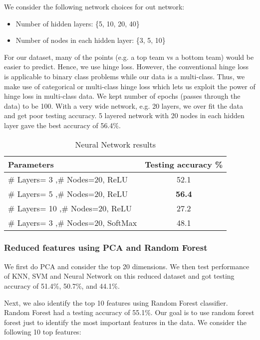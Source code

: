 \documentclass{article}
\begin{document}
We consider the following network choices for out network:
\begin{itemize}
	\item Number of hidden layers: \{5, 10, 20, 40\}
	\item Number of nodes in each hidden layer: \{3, 5, 10\} 
\end{itemize}
For our dataset, many of the points (e.g. a top team vs a bottom team) would be easier to predict. Hence, we use hinge loss. However, the conventional hinge loss is applicable to binary class problems while our data is a multi-class. Thus, we make use of categorical or multi-class hinge loss \cite{categorical_hinge} which lets us exploit the power of hinge loss in multi-class data. We kept number of epochs (passes through the data) to be 100. With a very wide network, e.g. 20 layers, we over fit the data and get poor testing accuracy. 5 layered network with 20 nodes in each hidden layer gave the best accuracy of 56.4\%.

\begin{table}
	\caption{Neural Network results}
	\label{tab:nn}
	\centering
	\begin{tabular}{l|c}
	\toprule
	\textbf{Parameters} & \textbf{Testing accuracy \%} \\
	\midrule
	\# Layers= 3 ,\# Nodes=20, ReLU  & 52.1\\
	\# Layers= 5 ,\# Nodes=20, ReLU  & \textbf{56.4} \\
	\# Layers= 10 ,\# Nodes=20, ReLU  & 27.2\\
	\# Layers= 3 ,\# Nodes=20, SoftMax  & 48.1\\
	\bottomrule
	\end{tabular}
\end{table}

\subsubsection*{Reduced features using PCA and Random Forest}
We first do PCA and consider the top 20 dimensions. We then test performance of KNN, SVM and Neural Network on this reduced dataset and got testing accuracy of 51.4\%, 50.7\%, and 44.1\%.


Next, we also identify the top 10 features using Random Forest classifier. Random Forest had a testing accuracy of 55.1\%. Our goal is to use random forest forest just to identify the most important features in the data.  We consider the following 10 top features:
\end{document}
